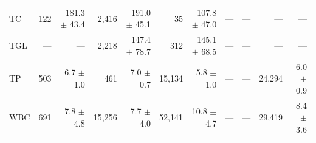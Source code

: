 \begin{table}[ht]
\begin{tabular}{lrrrrrrrrrr}
TC & 122 & 181.3 $\pm$ 43.4 & 2,416 & 191.0 $\pm$ 45.1 & 35 & 107.8 $\pm$ 47.0 & --- & --- & --- & --- \\
TGL & --- & --- & 2,218 & 147.4 $\pm$ 78.7 & 312 & 145.1 $\pm$ 68.5 & --- & --- & --- & --- \\
TP & 503 & 6.7 $\pm$ 1.0 & 461 & 7.0 $\pm$ 0.7 & 15,134 & 5.8 $\pm$ 1.0 & --- & --- & 24,294 & 6.0 $\pm$ 0.9 \\
WBC & 691 & 7.8 $\pm$ 4.8 & 15,256 & 7.7 $\pm$ 4.0 & 52,141 & 10.8 $\pm$ 4.7 & --- & --- & 29,419 & 8.4 $\pm$ 3.6 \\
\bottomrule
\end{tabular}
\label{tab:03_cohort_baseline}
\end{table}
